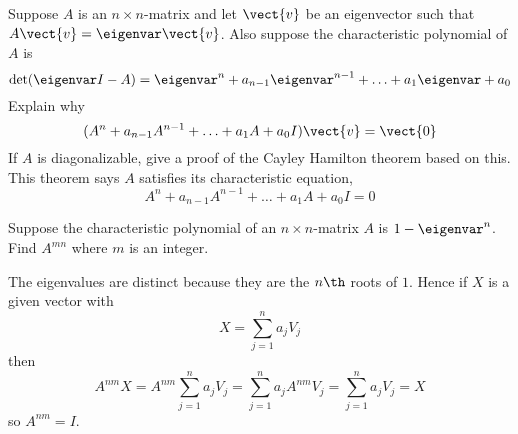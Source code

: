 \begin{ex}
  Suppose $A$ is an $n\times n$-matrix and let $\vect{v}$ be an
  eigenvector such that $A\vect{v}=\eigenvar \vect{v}$. Also suppose the
  characteristic polynomial of $A$ is
  \begin{equation*}
    \det (\eigenvar  I-A) =\eigenvar  ^{n}+a_{n-1} \eigenvar  ^{n-1}+\ldots+a_{1}\eigenvar  +a_{0}
  \end{equation*}
  Explain why
  \begin{equation*}
    (A^{n}+a_{n-1}A^{n-1}+\ldots +a_{1}A+a_{0}I) \vect{v}=\vect{0}
  \end{equation*}
  If $A$ is diagonalizable, give a proof of the Cayley Hamilton
  theorem based on this. This theorem says $A$ satisfies its
  characteristic equation,
  \begin{equation*}
    A^{n}+a_{n-1}A^{n-1}+\ldots +a_{1}A+a_{0}I=0
  \end{equation*}
\end{ex}

\begin{ex}
  Suppose the characteristic polynomial of an $n\times n$-matrix $A$ is
  $1-\eigenvar ^{n}$. Find $A^{mn}$ where $m$ is an integer.
  \begin{sol}
    The eigenvalues are distinct because
    they are the $n\th$ roots of $1$. Hence if $X$ is a given vector with
    \begin{equation*}
      X=\sum_{j=1}^{n}a_{j}V_{j}
    \end{equation*}
    then
    \begin{equation*}
      A^{nm}X=A^{nm}\sum_{j=1}^{n}a_{j}V_{j}=
      \sum_{j=1}^{n}a_{j}A^{nm}V_{j}=\sum_{j=1}^{n}a_{j}V_{j}=X
    \end{equation*}
    so $A^{nm}=I$.
  \end{sol}
\end{ex}


